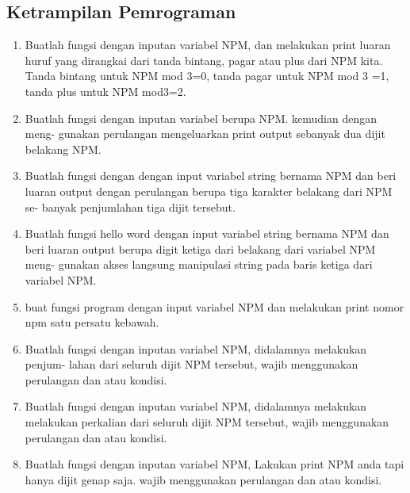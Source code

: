 \subsection{Ketrampilan Pemrograman}
\begin{enumerate}
    \item Buatlah fungsi dengan inputan variabel NPM, dan melakukan print luaran huruf
    yang dirangkai dari tanda bintang, pagar atau plus dari NPM kita. Tanda
    bintang untuk NPM mod 3=0, tanda pagar untuk NPM mod 3 =1, tanda plus
    untuk NPM mod3=2.
    

    \item Buatlah fungsi dengan inputan variabel berupa NPM. kemudian dengan meng-
    gunakan perulangan mengeluarkan print output sebanyak dua dijit belakang
    NPM.
    

    \item Buatlah fungsi dengan dengan input variabel string bernama NPM dan beri
    luaran output dengan perulangan berupa tiga karakter belakang dari NPM se-
    banyak penjumlahan tiga dijit tersebut.
    

    \item Buatlah fungsi hello word dengan input variabel string bernama NPM dan
    beri luaran output berupa digit ketiga dari belakang dari variabel NPM meng-
    gunakan akses langsung manipulasi string pada baris ketiga dari variabel NPM.
    

    \item buat fungsi program dengan input variabel NPM dan melakukan print nomor npm satu persatu kebawah.
    

    \item Buatlah fungsi dengan inputan variabel NPM, didalamnya melakukan penjum-
    lahan dari seluruh dijit NPM tersebut, wajib menggunakan perulangan dan
    atau kondisi.
    

    \item Buatlah fungsi dengan inputan variabel NPM, didalamnya melakukan melakukan
    perkalian dari seluruh dijit NPM tersebut, wajib menggunakan perulangan dan
    atau kondisi.
    

    \item Buatlah fungsi dengan inputan variabel NPM, Lakukan print NPM anda tapi
    hanya dijit genap saja. wajib menggunakan perulangan dan atau kondisi.
    


\end{enumerate}
